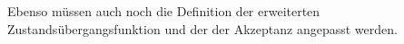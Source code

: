 \documentclass[11pt, a4paper]{article}
\begin{document}
\begin{flushleft}
\begin{tcolorbox}[title = Definition 3.4]
        Ebenso müssen auch noch die Definition der erweiterten Zustandsübergangsfunktion und der der Akzeptanz angepasst werden.
    \end{tcolorbox}


\end{flushleft}

\newpage
\end{document}

